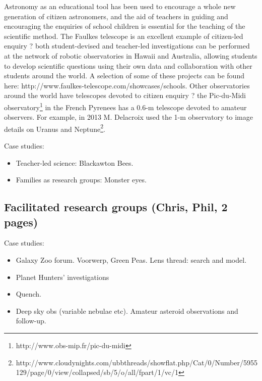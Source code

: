 \documentclass{ar2e}
\begin{document}
Astronomy as an educational tool has been used to encourage a whole new
generation of citizen astronomers, and the aid of teachers in guiding and
encouraging the enquiries of school children is essential for the teaching of
the scientific method.  The Faulkes telescope is an excellent example of
citizen-led enquiry ? both student-devised and teacher-led investigations can
be performed at the network of robotic observatories in Hawaii and Australia,
allowing students to develop scientific questions using their own data and
collaboration with other students around the world.  A selection of some of
these projects can be found here: 
http://www.faulkes-telescope.com/showcases/schools.  Other observatories
around the world have telescopes devoted to citizen enquiry ? the Pic-du-Midi
observatory\footnote{http://www.obs-mip.fr/pic-du-midi} in the French Pyrenees
has a 0.6-m telescope devoted to amateur observers.   For example, in 2013 M.
Delacroix used the 1-m observatory to image details on Uranus and
Neptune\footnote{http://www.cloudynights.com/ubbthreads/showflat.php/Cat/0/Number/5955129/page/0/view/collapsed/sb/5/o/all/fpart/1/vc/1}.

Case studies:
\begin{itemize}
\item Teacher-led science: Blackawton Bees. 
\item Families as research groups: Monster eyes. %
\end{itemize}



\subsection{Facilitated research groups (\textbf{Chris}, Phil, 2 pages)}
\label{sec:explore:groups}

Case studies:
\begin{itemize}
\item Galaxy Zoo forum. Voorwerp, Green Peas. Lens thread: search and model.
\item Planet Hunters' investigations
\item Quench.
\item Deep sky obs (variable nebulae etc). Amateur asteroid observations and follow-up.
\end{itemize}
\end{document}
